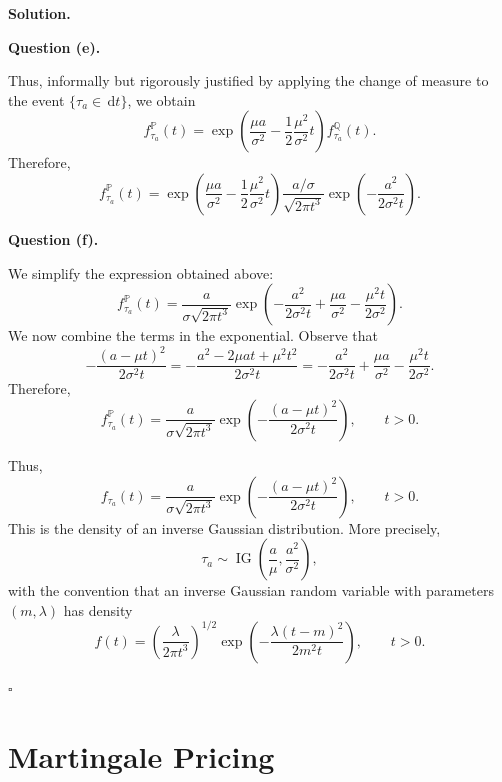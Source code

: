 \documentclass[11pt]{article}
\theoremstyle{plain}
\newcommand{\dd}{\,\mathrm{d}}
\newcommand{\1}{\mathbf{1}}
\theoremstyle{definition}
\newenvironment{solution}
{\par\medskip\noindent\textbf{Solution.}\par\medskip}
{\hfill$\square$\par\medskip}
\newenvironment{solutionpart}[1]
{\par\medskip\noindent\textbf{#1.}\par\smallskip}
{\par\medskip}
\begin{document}
\begin{solution}
\begin{solutionpart}{Question (e)}
Thus, informally but rigorously justified by applying the change of measure to the event
$\{\tau_a\in \dd t\}$, we obtain
\[
f_{\tau_a}^{\mathbb{P}}(t)
=
\exp\left(
\frac{\mu a}{\sigma^2}
-
\frac12\frac{\mu^2}{\sigma^2}t
\right)
f_{\tau_a}^{\mathbb{Q}}(t).
\]
Therefore,
\[
f_{\tau_a}^{\mathbb{P}}(t)
=
\exp\left(
\frac{\mu a}{\sigma^2}
-
\frac12\frac{\mu^2}{\sigma^2}t
\right)
\frac{a/\sigma}{\sqrt{2\pi t^3}}
\exp\left(-\frac{a^2}{2\sigma^2t}\right).
\]
\end{solutionpart}

\begin{solutionpart}{Question (f)}
We simplify the expression obtained above:
\[
f_{\tau_a}^{\mathbb{P}}(t)
=
\frac{a}{\sigma\sqrt{2\pi t^3}}
\exp\left(
-\frac{a^2}{2\sigma^2t}
+
\frac{\mu a}{\sigma^2}
-
\frac{\mu^2 t}{2\sigma^2}
\right).
\]
We now combine the terms in the exponential. Observe that
\[
-\frac{(a-\mu t)^2}{2\sigma^2 t}
=
-\frac{a^2-2\mu at+\mu^2t^2}{2\sigma^2t}
=
-\frac{a^2}{2\sigma^2t}
+
\frac{\mu a}{\sigma^2}
-
\frac{\mu^2t}{2\sigma^2}.
\]
Therefore,
\[
f_{\tau_a}^{\mathbb{P}}(t)
=
\frac{a}{\sigma\sqrt{2\pi t^3}}
\exp\left(
-\frac{(a-\mu t)^2}{2\sigma^2t}
\right),
\qquad t>0.
\]

Thus,
\[
\boxed{
f_{\tau_a}(t)
=
\frac{a}{\sigma\sqrt{2\pi t^3}}
\exp\left(
-\frac{(a-\mu t)^2}{2\sigma^2t}
\right),
\qquad t>0.
}
\]
This is the density of an inverse Gaussian distribution. More precisely,
\[
\tau_a
\sim
\operatorname{IG}\left(
\frac{a}{\mu},
\frac{a^2}{\sigma^2}
\right),
\]
with the convention that an inverse Gaussian random variable with parameters
$(m,\lambda)$ has density
\[
f(t)
=
\left(\frac{\lambda}{2\pi t^3}\right)^{1/2}
\exp\left(
-\frac{\lambda(t-m)^2}{2m^2t}
\right),
\qquad t>0.
\]
\end{solutionpart}
\end{solution}

\section{Martingale Pricing}
\end{document}
